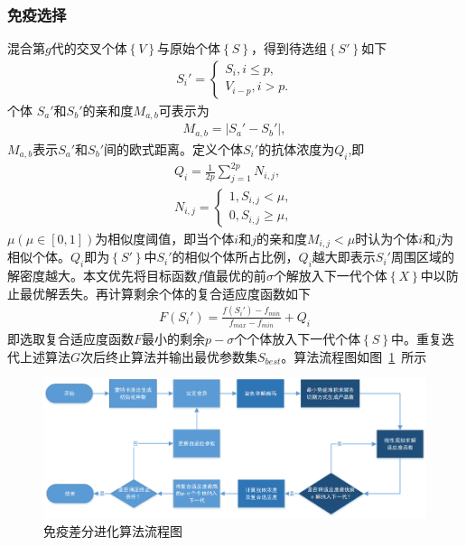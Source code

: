 \documentclass{whutmod}
\begin{document}
      \subsubsection{免疫选择}
    混合第$g$代的交叉个体$\left \{ V\right \}$与原始个体$\left \{ S \right \}$，得到待选组$\left \{ S '\right \}$如下
    \begin{gather*}
    S_i '=\left\{\begin{matrix}  S_i ,i\leqslant p,
    \\  V_{i-p},i>p.
    \end{matrix}\right.
    \end{gather*}
    个体 $S_a'$和$S_b '$的亲和度$M_{a,b}$可表示为
    \begin{gather*}
    M_{a,b}=|S_a'-S_b '|,
    \end{gather*}
    $M_{a,b}$表示$S_a'$和$S_b '$间的欧式距离。定义个体$S_i'$的抗体浓度为$Q_{i}$,即
    \begin{gather*}
    Q_{i}=\frac{1}{2p}\sum _{j=1}^{2p} N_{i,j},\\
    N_{i,j}=\left\{\begin{matrix}1,S_{i,j}< \mu,
    \\ 0,S_{i,j}\geqslant \mu  ,
    \end{matrix}\right.
    \end{gather*}
    $\mu(\mu\in[0,1])$为相似度阈值，即当个体$i$和$j$的亲和度$M_{i,j}<\mu$时认为个体$i$和$j$为相似个体。$Q_{i}$即为$\left \{ S'\right \}$中$S_i'$的相似个体所占比例，$Q_{i}$越大即表示$S_i '$周围区域的解密度越大。本文优先将目标函数$f$值最优的前$\sigma$个解放入下一代个体$\left \{ X\right \}$中以防止最优解丢失。再计算剩余个体的复合适应度函数如下
    \begin{gather*}
    F(S_i ')=\frac{f(S_i')-f_{min}}{f_{max}-f_{min}}+Q_{i}
    \end{gather*}
    即选取复合适应度函数$F$最小的剩余$p-\sigma$个个体放入下一代个体$\left \{ S\right \}$中。重复迭代上述算法$G$次后终止算法并输出最优参数集$S_{best}$。算法流程图如图~\ref{jndfg}~所示
    \begin{figure}[H]
    \centering
   	\includegraphics[width=\textwidth]{figures/chafen.png}
   	\caption{免疫差分进化算法流程图}\label{jndfg}
    \end{figure}
\end{document}
